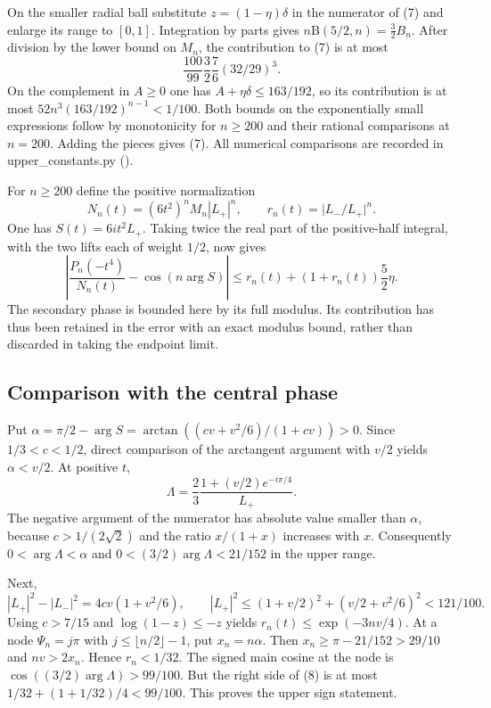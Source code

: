 \documentclass[11pt]{article}
\begin{document}
On the smaller radial ball substitute $z=(1-\eta)\delta$ in the numerator of (7) and enlarge its range to $[0,1]$. Integration by parts gives $n\mathrm B(5/2,n)=\frac32 B_n$. After division by the lower bound on $M_n$, the contribution to (7) is at most
\[
\frac{100}{99}\frac32\frac76(32/29)^3.
\]
On the complement in $A\ge0$ one has $A+\eta\delta\le163/192$, so its contribution is at most $52n^3(163/192)^{n-1}<1/100$. Both bounds on the exponentially small expressions follow by monotonicity for $n\ge200$ and their rational comparisons at $n=200$. Adding the pieces gives (7). All numerical comparisons are recorded in upper\_constants.py ().

For $n\ge200$ define the positive normalization
\[
N_n(t)=(6t^2)^n M_n |L_+|^n,\qquad
r_n(t)=\big|L_-/L_+\big|^n.
\]
One has $S(t)=6it^2L_+$. Taking twice the real part of the positive-half integral, with the two lifts each of weight $1/2$, now gives
\[
\left|\frac{P_n(-t^4)}{N_n(t)}-\cos(n\arg S)\right|
\le r_n(t)+(1+r_n(t))\frac52\eta.
\tag{8}
\]
The secondary phase is bounded here by its full modulus. Its contribution has thus been retained in the error with an exact modulus bound, rather than discarded in taking the endpoint limit.

\subsection{Comparison with the central phase}
\label{sec:comparison-with-the-central-phase}

Put $\alpha=\pi/2-\arg S=\arctan((cv+v^2/6)/(1+cv))>0$. Since $1/3<c<1/2$, direct comparison of the arctangent argument with $v/2$ yields $\alpha<v/2$. At positive $t$,
\[
\Lambda=\frac23\frac{1+(v/2)e^{-i\pi/4}}{L_+}.
\]
The negative argument of the numerator has absolute value smaller than $\alpha$, because $c>1/(2\sqrt2)$ and the ratio $x/(1+x)$ increases with $x$. Consequently $0<\arg\Lambda<\alpha$ and $0<(3/2)\arg\Lambda<21/152$ in the upper range.

Next,
\[
|L_+|^2-|L_-|^2=4cv(1+v^2/6),\qquad
|L_+|^2\le(1+v/2)^2+(v/2+v^2/6)^2<121/100.
\]
Using $c>7/15$ and $\log(1-z)\le-z$ yields $r_n(t)\le\exp(-3nv/4)$. At a node $\Psi_n=j\pi$ with $j\le\lfloor n/2\rfloor-1$, put $x_n=n\alpha$. Then $x_n\ge\pi-21/152>29/10$ and $nv>2x_n$. Hence $r_n<1/32$. The signed main cosine at the node is $\cos((3/2)\arg\Lambda)>99/100$. But the right side of (8) is at most $1/32+(1+1/32)/4<99/100$. This proves the upper sign statement.
\appendix
\end{document}
